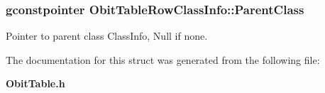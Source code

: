 \subsubsection{\setlength{\rightskip}{0pt plus 5cm}gconstpointer {\bf Obit\-Table\-Row\-Class\-Info::Parent\-Class}}\label{structObitTableRowClassInfo_o3}


Pointer to parent class Class\-Info, Null if none. 



The documentation for this struct was generated from the following file:\begin{CompactItemize}
\item 
{\bf Obit\-Table.h}\end{CompactItemize}

